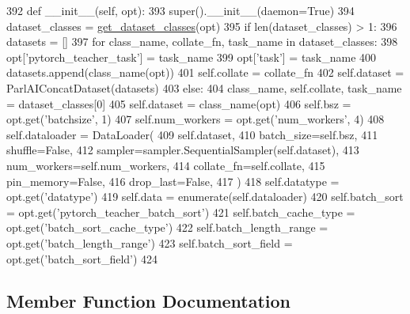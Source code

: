 \begin{DoxyCode}
392     \textcolor{keyword}{def }\_\_init\_\_(self, opt):
393         super().\_\_init\_\_(daemon=\textcolor{keyword}{True})
394         dataset\_classes = \hyperlink{namespaceparlai_1_1core_1_1pytorch__data__teacher_acd56d9ac5d68831c1e91690f26eb2328}{get\_dataset\_classes}(opt)
395         \textcolor{keywordflow}{if} len(dataset\_classes) > 1:
396             datasets = []
397             \textcolor{keywordflow}{for} class\_name, collate\_fn, task\_name \textcolor{keywordflow}{in} dataset\_classes:
398                 opt[\textcolor{stringliteral}{'pytorch\_teacher\_task'}] = task\_name
399                 opt[\textcolor{stringliteral}{'task'}] = task\_name
400                 datasets.append(class\_name(opt))
401                 self.collate = collate\_fn
402             self.dataset = ParlAIConcatDataset(datasets)
403         \textcolor{keywordflow}{else}:
404             class\_name, self.collate, task\_name = dataset\_classes[0]
405             self.dataset = class\_name(opt)
406         self.bsz = opt.get(\textcolor{stringliteral}{'batchsize'}, 1)
407         self.num\_workers = opt.get(\textcolor{stringliteral}{'num\_workers'}, 4)
408         self.dataloader = DataLoader(
409             self.dataset,
410             batch\_size=self.bsz,
411             shuffle=\textcolor{keyword}{False},
412             sampler=sampler.SequentialSampler(self.dataset),
413             num\_workers=self.num\_workers,
414             collate\_fn=self.collate,
415             pin\_memory=\textcolor{keyword}{False},
416             drop\_last=\textcolor{keyword}{False},
417         )
418         self.datatype = opt.get(\textcolor{stringliteral}{'datatype'})
419         self.data = enumerate(self.dataloader)
420         self.batch\_sort = opt.get(\textcolor{stringliteral}{'pytorch\_teacher\_batch\_sort'})
421         self.batch\_cache\_type = opt.get(\textcolor{stringliteral}{'batch\_sort\_cache\_type'})
422         self.batch\_length\_range = opt.get(\textcolor{stringliteral}{'batch\_length\_range'})
423         self.batch\_sort\_field = opt.get(\textcolor{stringliteral}{'batch\_sort\_field'})
424 
\end{DoxyCode}


\subsection{Member Function Documentation}
\mbox{\label{classparlai_1_1core_1_1pytorch__data__teacher_1_1LoaderProcess_ac22783ccf0ae30d6c7de23e5dc73792b}} 

